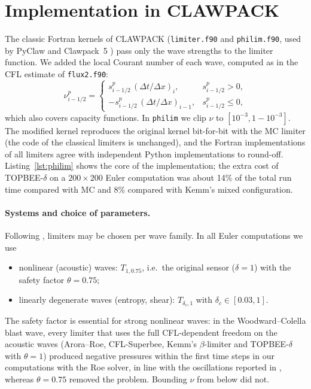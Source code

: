 \documentclass[11pt]{article}
\newcommand{\scheme}{TOPBEE-$\delta$}
\theoremstyle{plain}
\theoremstyle{definition}
\begin{document}
\section{Implementation in CLAWPACK}\label{sec:impl}
The classic Fortran kernels of CLAWPACK (\texttt{limiter.f90} and \texttt{philim.f90}, used by PyClaw \cite{PyClaw2012} and Clawpack~5 \cite{Clawpack,Mandli2016}) pass only the wave strengths to the limiter function. We added the local Courant number of each wave, computed as in the CFL estimate of \texttt{flux2.f90}:
\[
\nu^p_{i-1/2}=\begin{cases} s^p_{i-1/2}\,(\Delta t/\Delta x)_i,& s^p_{i-1/2}>0,\\ -s^p_{i-1/2}\,(\Delta t/\Delta x)_{i-1},& s^p_{i-1/2}\le0,\end{cases}
\]
which also covers capacity functions. In \texttt{philim} we clip $\nu$ to $[10^{-3},1-10^{-3}]$. The modified kernel reproduces the original kernel bit-for-bit with the MC limiter (the code of the classical limiters is unchanged), and the Fortran implementations of all limiters agree with independent Python implementations to round-off. Listing~\ref{lst:philim} shows the core of the implementation; the extra cost of \scheme{} on a $200\times200$ Euler computation was about 14\% of the total run time compared with MC and 8\% compared with Kemm's mixed configuration.

\paragraph{Systems and choice of parameters.} Following \cite{Kemm2011}, limiters may be chosen per wave family. In all Euler computations we use
\begin{itemize}
\item nonlinear (acoustic) waves: $T_{1,0.75}$, i.e.\ the original sensor ($\delta=1$) with the safety factor $\theta=0.75$;
\item linearly degenerate waves (entropy, shear): $T_{\delta_c,1}$ with $\delta_c\in[0.03,1]$.
\end{itemize}
The safety factor is essential for strong nonlinear waves: in the Woodward--Colella blast wave, every limiter that uses the full CFL-dependent freedom on the acoustic waves (Arora--Roe, CFL-Superbee, Kemm's $\beta$-limiter and \scheme{} with $\theta=1$) produced negative pressures within the first time steps in our computations with the Roe solver, in line with the oscillations reported in \cite[\S5.1]{Kemm2011}, whereas $\theta=0.75$ removed the problem. Bounding $\nu$ from below did not.
\end{document}
